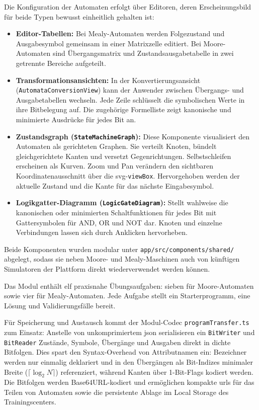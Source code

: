 
Die Konfiguration der Automaten erfolgt über Editoren, deren Erscheinungsbild für beide Typen bewusst einheitlich gehalten ist:
\begin{itemize}
  \item \textbf{Editor-Tabellen:} Bei Mealy-Automaten werden Folgezustand und Ausgabesymbol gemeinsam in einer Matrixzelle editiert. Bei Moore-Automaten sind Übergangsmatrix und Zustandsausgabetabelle in zwei getrennte Bereiche aufgeteilt.
  \item \textbf{Transformationsansichten:} In der Konvertierungsansicht (\verb|AutomataConversionView|) kann der Anwender zwischen Übergangs- und Ausgabetabellen wechseln. Jede Zeile schlüsselt die symbolischen Werte in ihre Bitbelegung auf. Die zugehörige Formelliste zeigt kanonische und minimierte Ausdrücke für jedes Bit an.
  \item \textbf{Zustandsgraph (\texttt{StateMachineGraph}):} Diese Komponente visualisiert den Automaten als gerichteten Graphen. Sie verteilt Knoten, bündelt gleichgerichtete Kanten und versetzt Gegenrichtungen. Selbstschleifen erscheinen als Kurven. Zoom und Pan verändern den sichtbaren Koordinatenausschnitt über die \gls{svg}-\verb|viewBox|. Hervorgehoben werden der aktuelle Zustand und die Kante für das nächste Eingabesymbol.
  \item \textbf{Logikgatter-Diagramm (\texttt{LogicGateDiagram}):} Stellt wahlweise die kanonischen oder minimierten Schaltfunktionen für jedes Bit mit Gattersymbolen für AND, OR und NOT dar. Knoten und einzelne Verbindungen lassen sich durch Anklicken hervorheben.
\end{itemize}
Beide Komponenten wurden modular unter \verb|app/src/components/shared/| abgelegt, sodass sie neben Moore- und Mealy-Maschinen auch von künftigen Simulatoren der Plattform direkt wiederverwendet werden können.


Das Modul enthält elf praxisnahe Übungsaufgaben: sieben für Moore-Automaten sowie vier für Mealy-Automaten. Jede Aufgabe stellt ein Starterprogramm, eine Lösung und Validierungsfälle bereit.

Für Speicherung und Austausch kommt der Modul-Codec \verb|programTransfer.ts| zum Einsatz: Anstelle von unkomprimiertem \gls{json} serialisieren ein \verb|BitWriter| und \verb|BitReader| Zustände, Symbole, Übergänge und Ausgaben direkt in dichte Bitfolgen. Dies spart den Syntax-Overhead von Attributnamen ein: Bezeichner werden nur einmalig deklariert und in den Übergängen als Bit-Indizes minimaler Breite ($\lceil\log_2 N\rceil$) referenziert, während Kanten über 1-Bit-Flags kodiert werden. Die Bitfolgen werden Base64URL-kodiert und ermöglichen kompakte \glspl{url} für das Teilen von Automaten sowie die persistente Ablage im Local Storage des Trainingscenters.
